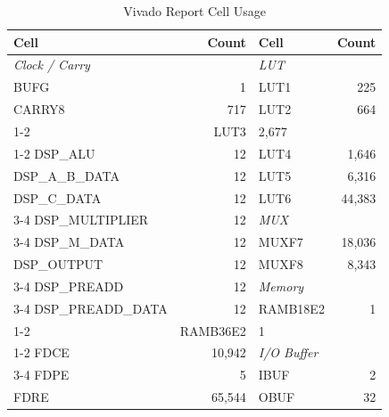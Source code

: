 \documentclass[12pt,a4paper]{report}
\begin{document}
\begin{table}[H]
\centering
\small
\caption{Vivado Report Cell Usage}
\begin{tabular}{|l|r|l|r|}
\hline
\textbf{Cell} & \textbf{Count} & \textbf{Cell} & \textbf{Count} \\
\hline
\multicolumn{2}{|l|}{\textit{Clock / Carry}} & \multicolumn{2}{l|}{\textit{LUT}} \\
\hline
BUFG   & 1   & LUT1 & 225    \\
CARRY8 & 717 & LUT2 & 664    \\
\cline{1-2}
\multicolumn{2}{|l|}{\textit{DSP}} & LUT3 & 2{,}677 \\
\cline{1-2}
DSP\_ALU          & 12 & LUT4 & 1{,}646 \\
DSP\_A\_B\_DATA   & 12 & LUT5 & 6{,}316 \\
DSP\_C\_DATA      & 12 & LUT6 & 44{,}383 \\
\cline{3-4}
DSP\_MULTIPLIER   & 12 & \multicolumn{2}{l|}{\textit{MUX}} \\
\cline{3-4}
DSP\_M\_DATA      & 12 & MUXF7 & 18{,}036 \\
DSP\_OUTPUT       & 12 & MUXF8 & 8{,}343  \\
\cline{3-4}
DSP\_PREADD       & 12 & \multicolumn{2}{l|}{\textit{Memory}} \\
\cline{3-4}
DSP\_PREADD\_DATA & 12 & RAMB18E2 & 1 \\
\cline{1-2}
\multicolumn{2}{|l|}{\textit{Flip-Flop}} & RAMB36E2 & 1 \\
\cline{1-2}
FDCE & 10{,}942 & \multicolumn{2}{l|}{\textit{I/O Buffer}} \\
\cline{3-4}
FDPE & 5        & IBUF & 2  \\
FDRE & 65{,}544 & OBUF & 32 \\
\hline
\end{tabular}
\end{table}
\end{document}
